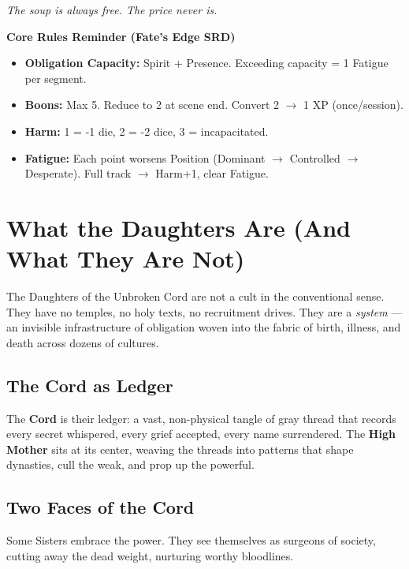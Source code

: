 \documentclass[10pt,twoside]{book}
\begin{document}
\emph{The soup is always free. The price never is.}

\tableofcontents
\newpage

\begin{sidebar}
\textbf{Core Rules Reminder (Fate's Edge SRD)}

\begin{itemize}
\item \textbf{Obligation Capacity:} Spirit + Presence. Exceeding capacity = 1 Fatigue per segment.
\item \textbf{Boons:} Max 5. Reduce to 2 at scene end. Convert 2 $\rightarrow$ 1 XP (once/session).
\item \textbf{Harm:} 1 = -1 die, 2 = -2 dice, 3 = incapacitated.
\item \textbf{Fatigue:} Each point worsens Position (Dominant $\rightarrow$ Controlled $\rightarrow$ Desperate). Full track $\rightarrow$ Harm+1, clear Fatigue.
\end{itemize}
\end{sidebar}


\chapter{What the Daughters Are (And What They Are Not)}

The Daughters of the Unbroken Cord are not a cult in the conventional sense. They have no temples, no holy texts, no recruitment drives. They are a \emph{system} --- an invisible infrastructure of obligation woven into the fabric of birth, illness, and death across dozens of cultures.

\section{The Cord as Ledger}

The \textbf{Cord} is their ledger: a vast, non-physical tangle of gray thread that records every secret whispered, every grief accepted, every name surrendered. The \textbf{High Mother} sits at its center, weaving the threads into patterns that shape dynasties, cull the weak, and prop up the powerful.

\section{Two Faces of the Cord}

Some Sisters embrace the power. They see themselves as surgeons of society, cutting away the dead weight, nurturing worthy bloodlines.
\end{document}
